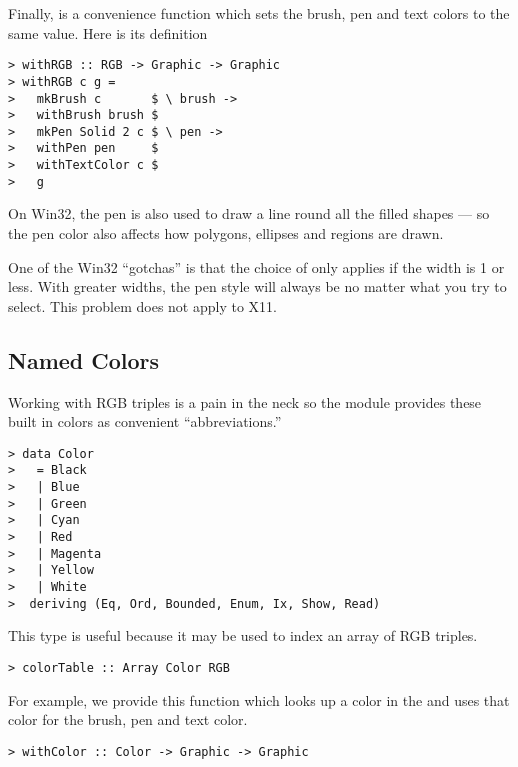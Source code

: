 Finally,  is a convenience function which sets the brush,
pen and text colors to the same value.  Here is its definition

\begin{verbatim}
> withRGB :: RGB -> Graphic -> Graphic
> withRGB c g = 
>   mkBrush c       $ \ brush ->
>   withBrush brush $
>   mkPen Solid 2 c $ \ pen ->
>   withPen pen     $
>   withTextColor c $
>   g
\end{verbatim}

\begin{portability}
\item
  On Win32, the pen is also used to draw a line round all
  the filled shapes --- so the pen color also affects how
  polygons, ellipses and regions are drawn.

\item
  One of the Win32 ``gotchas'' is that the choice of 
  only applies if the width is 1 or less.  With greater widths,
  the pen style will always be  no matter what you try to
  select.  This problem does not apply to X11.
\end{portability}


\subsection{Named Colors}

Working with RGB triples is a pain in the neck so the
 module provides these built in colors as
convenient ``abbreviations.''

\begin{verbatim}
> data Color 
>   = Black
>   | Blue
>   | Green 
>   | Cyan
>   | Red 
>   | Magenta
>   | Yellow
>   | White
>  deriving (Eq, Ord, Bounded, Enum, Ix, Show, Read)
\end{verbatim}

This type is useful because it may be used to index an array of
RGB triples.

\begin{verbatim}
> colorTable :: Array Color RGB
\end{verbatim}

For example, we provide this function which looks up a color in the
 and uses that color for the brush, pen and text color.

\begin{verbatim}
> withColor :: Color -> Graphic -> Graphic
\end{verbatim}

